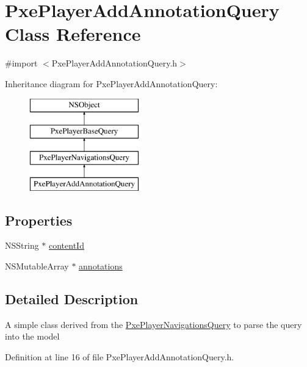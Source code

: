 \hypertarget{interface_pxe_player_add_annotation_query}{\section{Pxe\-Player\-Add\-Annotation\-Query Class Reference}
\label{interface_pxe_player_add_annotation_query}
}


{\ttfamily \#import $<$Pxe\-Player\-Add\-Annotation\-Query.\-h$>$}

Inheritance diagram for Pxe\-Player\-Add\-Annotation\-Query\-:\begin{figure}[H]
\begin{center}
\leavevmode
\includegraphics[height=4.000000cm]{interface_pxe_player_add_annotation_query}
\end{center}
\end{figure}
\subsection*{Properties}
\begin{DoxyCompactItemize}
\item 
N\-S\-String $\ast$ \hyperlink{interface_pxe_player_add_annotation_query_ac20c893521cbf285367245b250832e11}{content\-Id}
\item 
N\-S\-Mutable\-Array $\ast$ \hyperlink{interface_pxe_player_add_annotation_query_a93fc94c5081b1c0e5042c3a5cf13aa25}{annotations}
\end{DoxyCompactItemize}


\subsection{Detailed Description}
A simple class derived from the \hyperlink{interface_pxe_player_navigations_query}{Pxe\-Player\-Navigations\-Query} to parse the query into the model 

Definition at line 16 of file Pxe\-Player\-Add\-Annotation\-Query.\-h.



